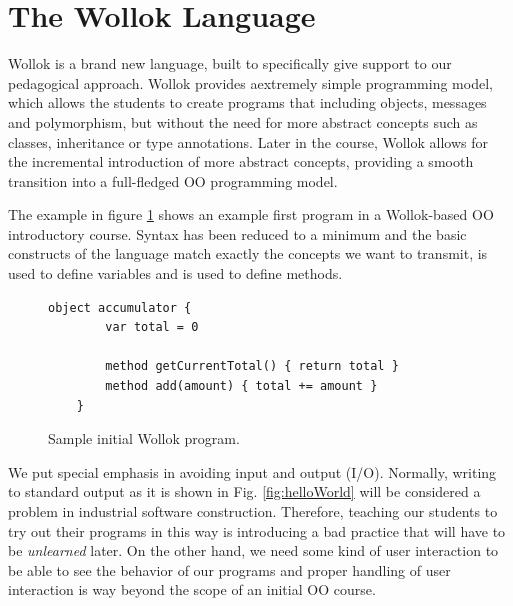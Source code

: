 \section{The Wollok Language}
\label{sec:wollokLanguage}


Wollok is a brand new language, built to specifically give support to our pedagogical approach. 
Wollok provides aextremely simple programming model, which allows the students to create programs that including objects, messages and polymorphism, but without the need for more abstract concepts such as classes, inheritance or type annotations.
Later in the course, Wollok allows for the incremental introduction of more abstract concepts,
providing a smooth transition into a full-fledged OO programming model.

The example in figure \ref{fig:helloWorld/wollok} shows an example first program in a Wollok-based OO introductory course.
Syntax has been reduced to a minimum and the basic constructs of the language match exactly the concepts we want to transmit, \eg {} is used to define variables and  is used to define methods.

\begin{figure}[ht]
 \centering
 \begin{lstlisting}[language=Wollok]
	object accumulator {
		var total = 0
		
		method getCurrentTotal() { return total }
		method add(amount) { total += amount }
	}
 \end{lstlisting}
 
 \caption{\small Sample initial Wollok program.}
 \label{fig:helloWorld/wollok}
\end{figure}

\medskip 

We put special emphasis in avoiding input and output (I/O). 
Normally, writing to standard output as it is shown in Fig. \ref{fig:helloWorld} will be considered a problem in industrial software construction.
Therefore, teaching our students to try out their programs in this way is introducing a bad practice that will have to be \emph{unlearned} later.
On the other hand, we need some kind of user interaction to be able to see the behavior of our programs and proper handling of user interaction is way beyond the scope of an initial OO course.

